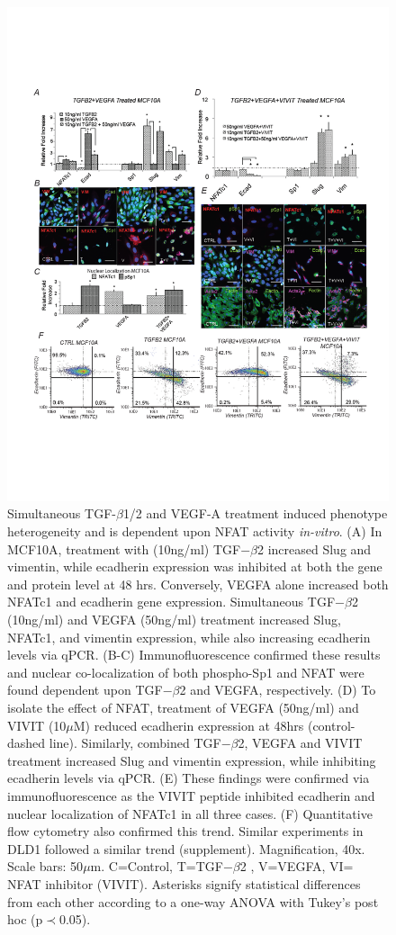 \documentclass[12pt]{article}
\begin{document}
\begin{figure}
\includegraphics [width=1.0\linewidth] {./figs/Fig-5-MCF10A-Validation.pdf}
\caption{Simultaneous TGF-$\beta$1/2 and VEGF-A treatment induced phenotype heterogeneity and is dependent upon NFAT activity \emph{in-vitro}.  (A) In MCF10A, treatment with (10ng/ml) TGF$-\beta$2 increased Slug and vimentin, while ecadherin expression was inhibited at both the gene and protein level at 48 hrs.  Conversely, VEGFA alone increased both NFATc1 and ecadherin gene expression.  Simultaneous TGF$-\beta$2 (10ng/ml) and VEGFA (50ng/ml) treatment increased Slug, NFATc1, and vimentin expression, while also increasing ecadherin levels via qPCR.  (B-C)  Immunofluorescence confirmed these results and nuclear co-localization of both phospho-Sp1 and NFAT were found dependent upon TGF$-\beta$2 and VEGFA, respectively. (D) To isolate the effect of NFAT, treatment of VEGFA (50ng/ml) and VIVIT (10$\mu$M) reduced ecadherin expression at 48hrs (control-dashed line).  Similarly, combined TGF$-\beta$2, VEGFA and VIVIT treatment increased Slug and vimentin expression, while inhibiting ecadherin levels via qPCR.  (E) These findings were confirmed via immunofluorescence as the VIVIT peptide inhibited ecadherin and nuclear localization of NFATc1 in all three cases.  (F)  Quantitative flow cytometry also confirmed this trend.  Similar experiments in DLD1 followed a similar trend (supplement).  Magnification, 40x. Scale bars: 50$\mu$m.  C=Control, T=TGF$-\beta$2 , V=VEGFA, VI= NFAT inhibitor (VIVIT).  Asterisks signify statistical differences from each other according to a one-way ANOVA with Tukey's post hoc (p$\prec$0.05).}\label{fg:F5}
\end{figure}
\end{document}
